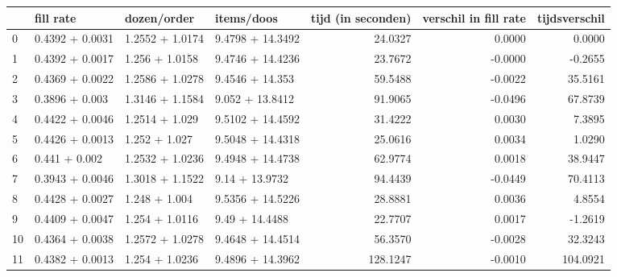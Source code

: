 \begin{tabular}{llllrrr}
\toprule
{} &        fill rate &      dozen/order &        items/doos &  tijd (in seconden) &  verschil in fill rate &  tijdsverschil \\
\midrule
0  &  0.4392 + 0.0031 &  1.2552 + 1.0174 &  9.4798 + 14.3492 &             24.0327 &                 0.0000 &         0.0000 \\
1  &  0.4392 + 0.0017 &   1.256 + 1.0158 &  9.4746 + 14.4236 &             23.7672 &                -0.0000 &        -0.2655 \\
2  &  0.4369 + 0.0022 &  1.2586 + 1.0278 &   9.4546 + 14.353 &             59.5488 &                -0.0022 &        35.5161 \\
3  &   0.3896 + 0.003 &  1.3146 + 1.1584 &   9.052 + 13.8412 &             91.9065 &                -0.0496 &        67.8739 \\
4  &  0.4422 + 0.0046 &   1.2514 + 1.029 &  9.5102 + 14.4592 &             31.4222 &                 0.0030 &         7.3895 \\
5  &  0.4426 + 0.0013 &    1.252 + 1.027 &  9.5048 + 14.4318 &             25.0616 &                 0.0034 &         1.0290 \\
6  &    0.441 + 0.002 &  1.2532 + 1.0236 &  9.4948 + 14.4738 &             62.9774 &                 0.0018 &        38.9447 \\
7  &  0.3943 + 0.0046 &  1.3018 + 1.1522 &    9.14 + 13.9732 &             94.4439 &                -0.0449 &        70.4113 \\
8  &  0.4428 + 0.0027 &    1.248 + 1.004 &  9.5356 + 14.5226 &             28.8881 &                 0.0036 &         4.8554 \\
9  &  0.4409 + 0.0047 &   1.254 + 1.0116 &    9.49 + 14.4488 &             22.7707 &                 0.0017 &        -1.2619 \\
10 &  0.4364 + 0.0038 &  1.2572 + 1.0278 &  9.4648 + 14.4514 &             56.3570 &                -0.0028 &        32.3243 \\
11 &  0.4382 + 0.0013 &   1.254 + 1.0236 &  9.4896 + 14.3962 &            128.1247 &                -0.0010 &       104.0921 \\
\bottomrule
\end{tabular}
